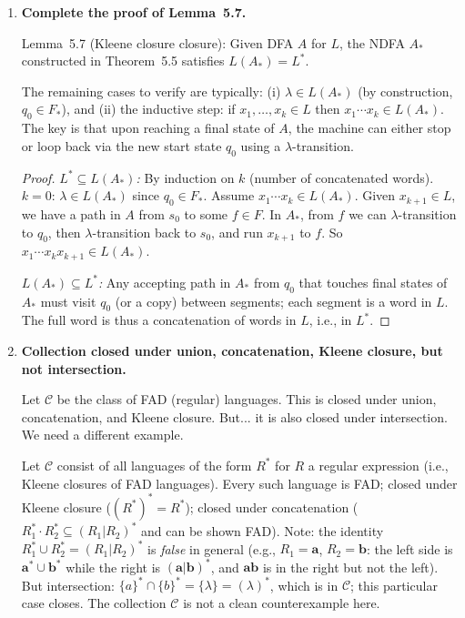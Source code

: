 \begin{enumerate}[{5.}1. ]
\textbf{Example.}  Let $A$ have $\Sigma=\{\pmb{a}\}$, $S=\{s_0,s_1\}$, $S_0=\{s_0\}$, $F=\{s_1\}$,
$\delta(s_0,\pmb{a})=\{s_0,s_1\}$, $\delta(s_1,\pmb{a})=\{s_1\}$.
Then $L(A)=\{\pmb{a}\}^+=\{\pmb{a},\pmb{aa},\ldots\}$.
After complementing: $F^\sim=\{s_0\}$.
$\pmb{a}$: from $s_0$, reach $\{s_0,s_1\}$; $s_0\in F^\sim$, so $\pmb{a}\in L(A^\sim)$.
But $\pmb{a}\in L(A)$, so $\pmb{a}\notin\sim L(A)$.  Thus $\pmb{a}\in L(A^\sim)$ but $\pmb{a}\notin\sim L(A)$, so $L(A^\sim)\neq\sim L(A)$.

\item \textbf{Complete the proof of Lemma~5.7.}

Lemma~5.7 (Kleene closure closure): Given DFA $A$ for $L$, the NDFA $A_*$ constructed in Theorem~5.5 satisfies $L(A_*)=L^*$.

The remaining cases to verify are typically: (i) $\lambda\in L(A_*)$ (by construction, $q_0\in F_*$), and (ii) the inductive step: if $x_1,\ldots,x_k\in L$ then $x_1\cdots x_k\in L(A_*)$.  The key is that upon reaching a final state of $A$, the machine can either stop or loop back via the new start state $q_0$ using a $\lambda$-transition.

\begin{proof}
\emph{$L^*\subseteq L(A_*)$:}  By induction on $k$ (number of concatenated words).  $k=0$: $\lambda\in L(A_*)$ since $q_0\in F_*$.  Assume $x_1\cdots x_k\in L(A_*)$.  Given $x_{k+1}\in L$, we have a path in $A$ from $s_0$ to some $f\in F$.  In $A_*$, from $f$ we can $\lambda$-transition to $q_0$, then $\lambda$-transition back to $s_0$, and run $x_{k+1}$ to $f$.  So $x_1\cdots x_kx_{k+1}\in L(A_*)$.

\emph{$L(A_*)\subseteq L^*$:}  Any accepting path in $A_*$ from $q_0$ that touches final states of $A_*$ must visit $q_0$ (or a copy) between segments; each segment is a word in $L$.  The full word is thus a concatenation of words in $L$, i.e., in $L^*$.
\end{proof}

\item \textbf{Collection closed under union, concatenation, Kleene closure, but not intersection.}

Let $\mathcal{C}$ be the class of FAD (regular) languages.  This is closed under union, concatenation, and Kleene closure.  But... it is also closed under intersection.  We need a different example.

Let $\mathcal{C}$ consist of all languages of the form $R^*$ for $R$ a regular expression (i.e., Kleene closures of FAD languages).  Every such language is FAD; closed under Kleene closure ($({R^*})^*=R^*$); closed under concatenation ($R_1^*\cdot R_2^*\subseteq(R_1|R_2)^*$ and can be shown FAD).
Note: the identity $R_1^*\cup R_2^*=(R_1|R_2)^*$ is \emph{false} in general (e.g., $R_1=\mathbf{a}$, $R_2=\mathbf{b}$: the left side is $\mathbf{a}^*\cup\mathbf{b}^*$ while the right is $(\mathbf{a}|\mathbf{b})^*$, and $\mathbf{ab}$ is in the right but not the left).
But intersection: $\{a\}^*\cap\{b\}^*=\{\lambda\}=(\lambda)^*$, which is in $\mathcal{C}$; this particular case closes. The collection $\mathcal{C}$ is not a clean counterexample here.


\end{enumerate}
